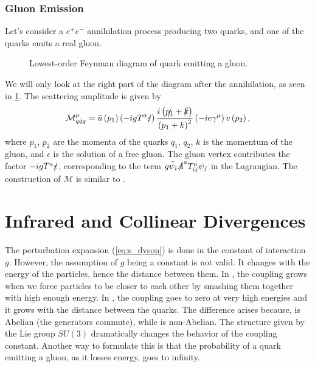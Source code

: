 \subsubsection*{Gluon Emission}
Let's consider a $e^+e^-$ annihilation process producing two quarks, and one of the quarks emits a real gluon.
\begin{figure}[htb]
        \centering
    \caption{Lowest-order Feynman diagram of quark emitting a gluon.}
    \label{fig:qg_emission}
\end{figure}
We will only look at the right part of the diagram after the annihilation, as seen in \cref{fig:qg_emission}.
The scattering amplitude is given by \cite{qcd}
\begin{equation}
    \label{eq:g_emission}
    \mathcal{M}_{q \bar{q} g}^\mu=\bar{u}\left(p_1\right)\left(-i g T^a \slashed{\epsilon} \right) \frac{i\left(\slashed{p_1} +\slashed{k}\right)}{\left(p_1+k\right)^2}\left(-i e \gamma^\mu\right) v\left(p_2\right) ,
\end{equation}
where $p_1$, $p_2$ are the momenta of the quarks $q_1$, $q_2$, $k$ is the momentum of the gluon, and $\epsilon$ is the solution of a free gluon.
The gluon vertex contributes the factor $-igT^a\slashed{\epsilon}$, corresponding to the term $g \bar{\psi}_i \slashed{A}^a T^a_{ij} \psi_j$ in the Lagrangian.
The construction of $\mathcal{M}$ is similar to \QED.

\section{Infrared and Collinear Divergences}
\label{sec:IR_div}
The perturbation expansion (\ref{eq:s_dyson}) is done in the constant of interaction $g$. 
However, the assumption of $g$ being a constant is not valid.
It changes with the energy of the particles, hence the distance between them. 
In \QED, the coupling grows when we force particles to be closer to each other by smashing
them together with high enough energy.
In \QCD, the coupling goes to zero at very high energies and it grows with the distance between the quarks.
The difference arises because, \QED is Abelian (the generators commute), while \QCD is non-Abelian.
The structure given by the Lie group $SU(3)$ dramatically changes the behavior of the coupling constant.
Another way to formulate this is that the probability of a quark emitting a gluon, as it losses energy, goes to infinity.

